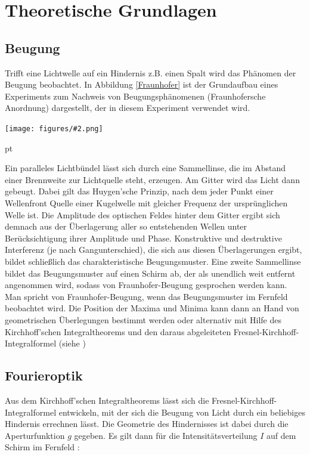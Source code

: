 \documentclass[12pt]{article}
\newcommand{\gra}[3][0.7]{
	\begin{minipage}[h!]{\textwidth}
		\centering
		\texttt{[image: figures/\#2.png]}
		\captionof{figure}{#3}
	\end{minipage}
	\vskip 30 pt
}
\begin{document}
\newpage
\section{Theoretische Grundlagen}

\subsection{Beugung}

Trifft eine Lichtwelle auf ein Hindernis z.B. einen Spalt wird das Phänomen der Beugung beobachtet. In Abbildung \ref{Fraunhofer} ist  der Grundaufbau eines Experiments zum Nachweis von Beugungsphänomenen (Fraunhofersche Anordnung) dargestellt, der in diesem Experiment verwendet wird. 

\gra{Fraunhofer}{Fraunhofersche Anordnung \label{Fraunhofer}}   

Ein paralleles Lichtbündel lässt sich durch eine Sammellinse, die im Abstand einer Brennweite zur Lichtquelle steht, erzeugen. Am Gitter wird das Licht dann gebeugt. Dabei gilt das Huygen'sche Prinzip, nach dem jeder Punkt einer Wellenfront Quelle einer Kugelwelle mit gleicher Frequenz der ursprünglichen Welle ist. Die Amplitude des optischen Feldes hinter dem Gitter ergibt sich demnach aus der Überlagerung aller so entstehenden Wellen unter Berücksichtigung ihrer Amplitude und Phase. Konstruktive und destruktive Interferenz (je nach Gangunterschied), die sich aus diesen Überlagerungen ergibt, bildet schließlich das charakteristische Beugungsmuster. Eine zweite Sammellinse bildet das Beugungsmuster auf einen Schirm ab, der als unendlich weit entfernt angenommen wird, sodass von Fraunhofer-Beugung gesprochen werden kann. Man spricht von Fraunhofer-Beugung, wenn das Beugungsmuster im Fernfeld beobachtet wird. Die Position der Maxima und Minima kann dann an Hand von geometrischen Überlegungen bestimmt werden oder alternativ mit Hilfe des Kirchhoff'schen Integraltheorems und den daraus abgeleiteten Fresnel-Kirchhoff-Integralformel (siehe \label{Fourier})

\subsection{Fourieroptik}  

Aus dem  Kirchhoff'schen Integraltheorems lässt sich die Fresnel-Kirchhoff-Integralformel entwickeln, mit der sich die Beugung von Licht durch ein beliebiges Hindernis errechnen lässt. Die Geometrie des Hindernisses ist dabei durch die Aperturfunktion $g$ gegeben. Es gilt dann für die Intensitätsverteilung $I$ auf dem Schirm im Fernfeld \cite{kirch}: 
\end{document}
